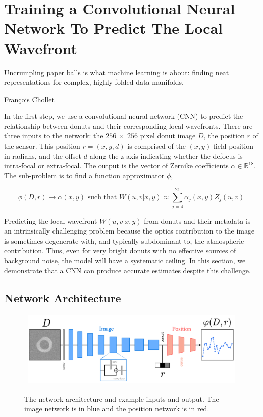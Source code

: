 \chapter{Training a Convolutional Neural Network To Predict The Local Wavefront}
\label{chap:cnn}

\epigraph{Uncrumpling paper balls is what machine learning is about: finding neat representations for complex, highly folded data manifolds.}{Fran\c{c}ois Chollet}

In the first step, we use a convolutional neural network (CNN) to predict the relationship between donuts and their corresponding local wavefronts. There are three inputs to the network: the $256\ \times\ 256$ pixel donut image $D$, the position $r$ of the sensor. This position $r = (x,y,d)$ is comprised of the $(x,y)$ field position in radians, and the offset $d$ along the z-axis indicating whether the defocus is intra-focal or extra-focal. The output is the vector of Zernike coefficients $\alpha \in \mathbb{R}^{18}$. The sub-problem is to find a function approximator $\phi$,

\begin{equation*}
\phi(D, r) \to \alpha(x,y) \text{ such that } W(u,v|x,y) \approx \sum_{j=4}^{21}\alpha_j(x,y)Z_j(u,v)
\end{equation*}

Predicting the local wavefront $W(u,v|x,y)$ from donuts and their metadata is an intrinsically challenging problem because the optics contribution to the image is sometimes degenerate with, and typically subdominant to, the atmospheric contribution. Thus, even for very bright donuts with no effective sources of background noise, the model will have a systematic ceiling. In this section, we demonstrate that a CNN can produce accurate estimates despite this challenge.

\section{Network Architecture}

\begin{figure}[!htbp]
\begin{center}
\begin{tabular}{c}
\includegraphics[width=\textwidth]{figs/cnn/arch.png}
\end{tabular}
\end{center}
\caption[Network Architecture]{The network architecture and example inputs and output. The image network is in blue and the position network is in red.\label{fig:arch}}
\end{figure}


